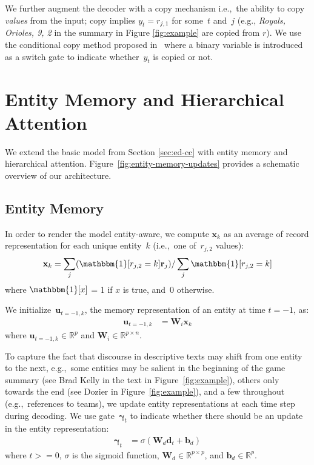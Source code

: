 \documentclass[11pt,a4paper]{article}
\begin{document}
We further augment the decoder with a copy mechanism i.e.,~the ability
to copy \emph{values} from the input; copy implies $y_t=r_{j,1}$ for
some~$t$ and~$j$ (e.g., \textsl{Royals, Orioles, 9, 2} in the summary
in Figure \ref{fig:example} are copied from $r$).  We use the
conditional copy method proposed in~\citet{P16-1014} where a binary
variable is introduced as a switch gate to indicate whether~$y_t$ is copied
or not.



\section{Entity Memory and Hierarchical Attention}
\label{sec:entity-memory}
We extend the basic model from Section \ref{sec:ed-cc} with entity
memory and hierarchical
attention. Figure~\ref{fig:entity-memory-updates} provides a schematic
overview of our architecture.

\subsection{Entity Memory}
In order to render the model entity-aware, we compute $\mathbf{x}_k$ as an average of record representation for each 
unique entity~$k$ (i.e.,~one of~$r_{j,2}$ values):
\begin{equation}
\mathbf{x}_k = \sum_j( \mathbbm{1}[r_{j,2} = k]\mathbf{r}_{j})/ \sum_j \mathbbm{1}[r_{j,2} = k] \label{eq:x_k}
\end{equation}
where $\mathbbm{1}[x]$ = 1 if $x$ is true, and~0 otherwise.

We initialize~$\mathbf{u}_{t=-1,k}$, the memory representation of
an entity at time $t=-1$, as:
\begin{align}
\mathbf{u}_{t=-1,k} &= \mathbf{W}_i \mathbf{x}_k  \label{eq:u_t-1_k}
\end{align}
where $\mathbf{u}_{t=-1,k} \in \mathbb{R}^{p}$ and
$\mathbf{W}_i \in \mathbb{R}^{p \times n}$.

To capture the fact that discourse in descriptive texts may shift from
one entity to the next, e.g.,~some entities may be salient in the
beginning of the game summary (see Brad Kelly in the text in
Figure~\ref{fig:example}), others only towards the end (see Dozier in
Figure~\ref{fig:example}), and a few throughout (e.g.,~references to
teams), we update entity representations at each time step during
decoding.  We use gate~$\boldsymbol{\gamma}_t$ to indicate whether
there should be an update in the entity representation:
\begin{align}
\boldsymbol{\gamma}_t &= \sigma (\mathbf{W}_d \mathbf{d}_t +
\mathbf{b}_d) \label{eq:gamma:attention}
\end{align}
where $t>=0$, $\sigma$ is the sigmoid function,
$\mathbf{W}_d \in \mathbb{R}^{p \times p}$, and
$\mathbf{b}_d \in \mathbb{R}^{p}$.
\end{document}
